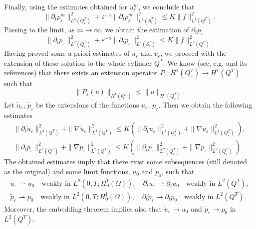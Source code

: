 \documentclass[10pt,a4paper]{amsart}
\numberwithin{equation}{section}
\begin{document}
Finally, using the estimates obtained for $u_{\varepsilon }^m$, we conclude that
\begin{equation}
\| \partial _{t}p_{\varepsilon }^m\| _{L^2(Q_{\varepsilon
}^{T})}^2+\varepsilon ^{-\gamma }\| \partial _{t}p_{\varepsilon
}^m\| _{L^2(S_{\varepsilon }^{T})}^2\leq K\| f\|
_{L^2(Q^{T})}^2.
\end{equation}
Passing to the limit, as $m\to \infty $, we obtain the estimation of
$\partial _{t}p_{\varepsilon }$
\begin{equation}
\| \partial _{t}p_{\varepsilon }\| _{L^2(Q_{\varepsilon
}^{T})}^2+\varepsilon ^{-\gamma }\| \partial _{t}p_{\varepsilon }\|
_{L^2(S_{\varepsilon }^{T})}^2\leq K\| f\| _{L^2(Q^{T})}^2.
\end{equation}
Having proved some a priori estimates of $u_{\varepsilon }$ and
$v_{\varepsilon }$, we proceed with the extension of these solution to the
whole cylinder $Q^{T}$. We know (see, e.g. \cite{DiGoShBook} and its
references) that there exists an extension operator $P_{\varepsilon
}:H^{1}(Q_{\varepsilon }^{T})\to H^{1}(Q^{T})$ such that
\[
\| P_{\varepsilon }(u)\| _{H^{1}(Q^{T})}\leq \| u\|
_{H^{1}(Q_{\varepsilon }^{T})}.
\]
Let $\tilde{u}_{\varepsilon }$, $\tilde{p}_{\varepsilon }$ be the extensions
of the functions $u_{\varepsilon }$, $p_{\varepsilon }$. Then we obtain the
following estimates
\begin{gather}
\| \partial _{t}\tilde{u}_{\varepsilon }\| _{L^2(Q^{T})}^2+\|
\nabla \tilde{u}_{\varepsilon }\| _{L^2(Q^{T})}^2\leq K(\|
\partial _{t}u_{\varepsilon }\| _{L^2(Q_{\varepsilon }^{T})}^2+\|
\nabla u_{\varepsilon }\| _{L^2(Q_{\varepsilon }^{T})}^2),
\label{ext u estim} \\
\| \partial _{t}\tilde{p}_{\varepsilon }\| _{L^2(Q^{T})}^2+\|
\nabla \tilde{p}_{\varepsilon }\| _{L^2(Q^{T})}^2\leq K(\|
\partial _{t}p_{\varepsilon }\| _{L^2(Q_{\varepsilon }^{T})}^2+\|
\nabla p_{\varepsilon }\| _{L^2(Q_{\varepsilon }^{T})}^2).
\label{ext p estim}
\end{gather}
The obtained estimates imply that there exist some subsequences (still
denoted as the original) and some limit functions, $u_0$ and $p_0$, such
that
\begin{equation}
\begin{gathered}
\tilde{u}_{\varepsilon }\rightharpoonup u_0\quad
 \text{weakly in }L^2(0,T;H_0^{1}(\Omega )),\quad
\partial _{t}\tilde{u}_{\varepsilon }\rightharpoonup \partial _{t}u_0\quad
\text{weakly in }L^2(Q^{T}), \\
\tilde{p}_{\varepsilon }\rightharpoonup p_0\quad
 \text{weakly in }L^2(0,T;H_0^{1}(\Omega )),\quad
\partial _{t}\tilde{p}_{\varepsilon }\rightharpoonup \partial _{t}p_0\quad
 \text{weakly in }L^2(Q^{T}).
\end{gathered}  \label{limit func def}
\end{equation}
Moreover, the embedding theorem implies also that
$\tilde{u}_{\varepsilon}\to u_0$ and $\tilde{p}_{\varepsilon }\to p_0$ in
$L^2(Q^{T})$.
\end{document}
